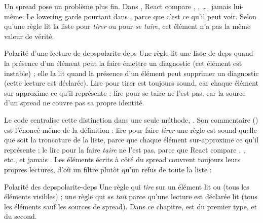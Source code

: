 Un spread pose un problème plus fin. Dans , React compare , , …, jamais  lui-même. Le lowering garde pourtant  dans , parce que c'est ce qu'il peut voir. Selon qu'une règle lit la liste pour \emph{tirer} ou pour \emph{se taire}, cet élément n'a pas la même valeur de vérité.

\begin{definition}{Polarité d'une lecture de deps}{polarite-deps}
Une règle lit une liste de deps  quand la présence d'un élément peut la faire émettre un diagnostic (\og cet élément est instable\fg{}) ; elle la lit  quand la présence d'un élément peut supprimer un diagnostic (\og cette lecture est déclarée\fg{}). Lire  pour tirer est toujours sound, car chaque élément sur-approxime ce qu'il représente ; lire  pour se taire ne l'est pas, car la source d'un spread ne couvre pas sa propre identité.
\end{definition}

Le code centralise cette distinction dans une seule méthode, . Son commentaire () est l'énoncé même de la définition : lire  pour faire \emph{tirer} une règle est sound quelle que soit la troncature de la liste, parce que chaque élément sur-approxime ce qu'il représente ; le lire pour la faire \emph{taire} ne l'est pas, parce que React compare , , etc., et jamais . Les éléments écrits à côté du spread couvrent toujours leurs propres lectures, d'où un filtre plutôt qu'un refus de toute la liste :


\begin{invariant}{Polarité des deps}{polarite-deps}
Une règle qui \emph{tire} sur un élément lit  ou  (tous les éléments visibles) ; une règle qui \emph{se tait} parce qu'une lecture est déclarée lit  (tous les éléments sauf les sources de spread). Dans ce chapitre,  est du premier type,  et  du second.
\end{invariant}


